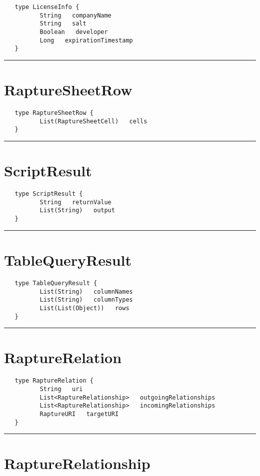 \begin{verbatim}
   type LicenseInfo {
          String   companyName
          String   salt
          Boolean   developer
          Long   expirationTimestamp
   }
\end{verbatim}

\rule{15cm}{2pt}
\section{RaptureSheetRow}
\label{type:RaptureSheetRow}

\begin{verbatim}
   type RaptureSheetRow {
          List(RaptureSheetCell)   cells
   }
\end{verbatim}

\rule{15cm}{2pt}
\section{ScriptResult}
\label{type:ScriptResult}

\begin{verbatim}
   type ScriptResult {
          String   returnValue
          List(String)   output
   }
\end{verbatim}

\rule{15cm}{2pt}
\section{TableQueryResult}
\label{type:TableQueryResult}

\begin{verbatim}
   type TableQueryResult {
          List(String)   columnNames
          List(String)   columnTypes
          List(List(Object))   rows
   }
\end{verbatim}

\rule{15cm}{2pt}
\section{RaptureRelation}
\label{type:RaptureRelation}

\begin{verbatim}
   type RaptureRelation {
          String   uri
          List<RaptureRelationship>   outgoingRelationships
          List<RaptureRelationship>   incomingRelationships
          RaptureURI   targetURI
   }
\end{verbatim}

\rule{15cm}{2pt}
\section{RaptureRelationship}
\label{type:RaptureRelationship}

